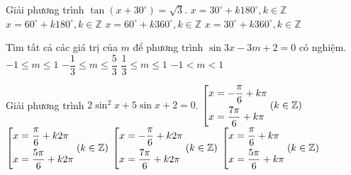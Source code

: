 \begin{ex}%
	Giải phương trình $\tan (x+30^{\circ})=\sqrt{3}$.
	\choice
	{\True $x=30^{\circ}+k180^{\circ}, k \in \mathbb{Z}$}
	{$x=60^{\circ}+k180^{\circ}, k \in \mathbb{Z}$}
	{$x=60^{\circ}+k360^{\circ}, k \in \mathbb{Z}$}
	{$x=30^{\circ}+k360^{\circ}, k \in \mathbb{Z}$}
\end{ex}
\begin{ex}%
	Tìm tất cả các giá trị của $m$ để phương trình $\sin 3x-3m+2=0$ có nghiệm.
	\choice
	{$-1 \le m \le 1$}
	{$-\dfrac{1}{3} \le m \le \dfrac{5}{3}$}
	{\True $\dfrac{1}{3} \le m \le 1$}
	{$-1 <m<1$}
\end{ex}
\begin{ex}%
	Giải phương trình $2\sin^2x+5\sin x+2=0$.
	\choice
	{$\left[\begin{aligned}&x=-\dfrac{\pi}{6}+k\pi\\&x=\dfrac{7\pi}{6}+k\pi\end{aligned}\right.(k \in \mathbb{Z})$}
	{$\left[\begin{aligned}&x=\dfrac{\pi}{6}+k2\pi\\&x=\dfrac{5\pi}{6}+k2\pi\end{aligned}\right.(k \in \mathbb{Z})$}
	{\True $\left[\begin{aligned}&x=-\dfrac{\pi}{6}+k2\pi\\&x=\dfrac{7\pi}{6}+k2\pi\end{aligned}\right.(k \in \mathbb{Z})$}
	{$\left[\begin{aligned}&x=\dfrac{\pi}{6}+k\pi\\&x=\dfrac{5\pi}{6}+k\pi\end{aligned}\right.(k \in \mathbb{Z})$}
\end{ex}

